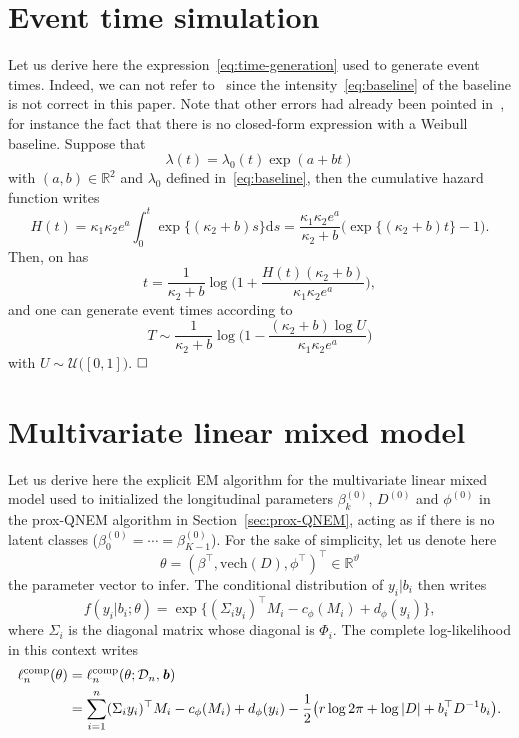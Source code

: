 \documentclass[11pt]{article}
\newcommand{\dd}{\mathrm{d}}
\newcommand{\cD}{\mathcal D}
\newcommand{\cU}{\mathcal U}
\newcommand{\R}{\mathds R}
\begin{document}
\section{Event time simulation}
\label{sec:event-time-simu}

Let us derive here the expression~\eqref{eq:time-generation} used to generate event times. Indeed, we can not refer to~\citet{austin2012generating} since the intensity~\eqref{eq:baseline} of the baseline is not correct in this paper.
Note that other errors had already been pointed in~\citep{austin2013correction}, for instance the fact that there is no closed-form expression with a Weibull baseline.
Suppose that
\[\lambda(t) = \lambda_0(t) \exp (a + b t)\]
with $(a, b) \in \R^2$ and $\lambda_0$ defined in~\eqref{eq:baseline}, then the cumulative hazard function writes
\[H(t) = \kappa_1 \kappa_2 e^a \int_0^t \exp\{(\kappa_2 + b)s \} \dd s = \dfrac{\kappa_1 \kappa_2 e^a}{\kappa_2 + b} \big( \exp\{(\kappa_2 + b) t\} - 1 \big).\]
Then, on has
\[t = \dfrac{1}{\kappa_2 + b} \log \Big( 1 + \dfrac{H(t)(\kappa_2 + b)}{\kappa_1 \kappa_2 e^a} \Big),\]
and one can generate event times according to
\[ T \sim \dfrac{1}{\kappa_2 + b} \log \Big( 1 - \dfrac{(\kappa_2 + b)\log U}{\kappa_1 \kappa_2 e^a} \Big) \]
with $U \sim \cU\big([0,1]\big)$.
$\hfill\square$

\section{Multivariate linear mixed model}
\label{sec:MLMM}

Let us derive here the explicit EM algorithm for the multivariate linear mixed model used to initialized the longitudinal parameters $\beta_k^{(0)}$, $D^{(0)}$ and $\phi^{(0)}$ in the prox-QNEM algorithm in Section~\ref{sec:prox-QNEM}, acting as if there is no latent classes ($\beta_0^{(0)} = \cdots = \beta_{K-1}^{(0)}$).
For the sake of simplicity, let us denote here 
\[\theta = (\beta^\top, \text{vech}(D), \phi^\top)^\top \in \R^\vartheta\]
the parameter vector to infer.
The conditional distribution of $y_i|b_i$ then writes
\[f(y_i|b_i ; \theta) = \exp \big\{( \Sigma_iy_i)^\top M_{i} - c_\phi(M_{i}) + d_\phi(y_i) \big\},\]
where $\Sigma_i$ is the diagonal matrix whose diagonal is $\Phi_i$. 
The complete log-likelihood in this context writes
\begin{align*}
\ell_n^\text{comp}(\theta) &= \ell_n^\text{comp}(\theta ; \cD_n, \textbf{\textit{b}}) \\
&= \sum_{i=1}^n (\Sigma_iy_i)^\top M_{i} - c_\phi(M_{i}) + d_\phi(y_i) -\dfrac12 \big(r \log 2\pi + \log|D| + b_i^\top D^{-1}b_i\big).
\end{align*}
  
\end{document}
